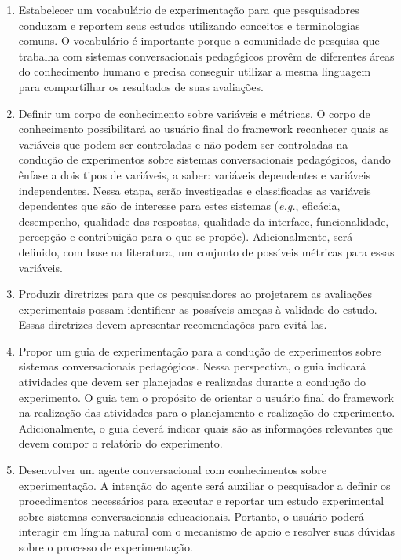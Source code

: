 \begin{enumerate}

   \item Estabelecer um vocabulário de experimentação para que pesquisadores conduzam e reportem seus estudos utilizando conceitos e terminologias comuns. O vocabulário é importante porque a comunidade de pesquisa que trabalha com sistemas conversacionais pedagógicos provêm de diferentes áreas do conhecimento humano e precisa conseguir utilizar a mesma linguagem para compartilhar os resultados de suas avaliações.

    \item Definir um corpo de conhecimento sobre variáveis e métricas. O corpo de conhecimento possibilitará ao usuário final do framework  reconhecer quais as variáveis que podem ser controladas e não podem ser controladas na condução de experimentos sobre sistemas conversacionais pedagógicos, dando ênfase a dois tipos de variáveis, a saber: variáveis dependentes e variáveis independentes. Nessa etapa, serão investigadas e classificadas as variáveis dependentes que são de interesse para estes sistemas (\textit{e.g.}, eficácia, desempenho, qualidade das respostas, qualidade da interface, funcionalidade, percepção e contribuição para o que se propõe). Adicionalmente, será definido, com base na literatura, um conjunto de possíveis métricas para essas variáveis.

   \item Produzir diretrizes para que os pesquisadores ao projetarem as avaliações experimentais possam identificar as possíveis ameças à validade do estudo. Essas diretrizes devem apresentar recomendações para evitá-las.

   \item Propor um guia de experimentação para a condução de experimentos sobre sistemas conversacionais pedagógicos. Nessa perspectiva, o guia indicará atividades que devem ser planejadas e realizadas durante a condução do experimento. O guia tem o propósito de orientar o usuário final do framework na realização das atividades para o planejamento e realização do experimento. Adicionalmente, o guia deverá indicar quais são as informações relevantes que devem compor o relatório do experimento.
   
   \item Desenvolver um agente conversacional com conhecimentos sobre experimentação. A intenção do agente será auxiliar o pesquisador a definir os procedimentos necessários para executar e reportar um estudo experimental sobre sistemas conversacionais educacionais. Portanto, o usuário poderá interagir em língua natural com o mecanismo de apoio e resolver suas dúvidas sobre o processo de experimentação.  
   
\end{enumerate}
 
